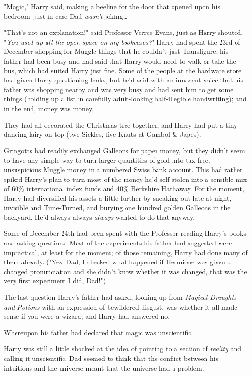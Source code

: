 "Magic," Harry said, making a beeline for the door that opened upon his 
bedroom, just in case Dad \emph{wasn't} joking{\ldots}

"That's not an explanation!" said Professor Verres-Evans, just as Harry 
shouted, "\emph{You used up all the open space on my bookcases?}"
\sbreak
Harry had spent the 23rd of December shopping for Muggle things that he 
couldn't just Transfigure; his father had been busy and had said that Harry 
would need to walk or take the bus, which had suited Harry just fine. Some of 
the people at the hardware store had given Harry questioning looks, but he'd 
said with an innocent voice that his father was shopping nearby and was very 
busy and had sent him to get some things (holding up a list in carefully 
adult-looking half-illegible handwriting); and in the end, money was money.

They had all decorated the Christmas tree together, and Harry had put a tiny 
dancing fairy on top (two Sickles, five Knuts at Gambol \& Japes).

Gringotts had readily exchanged Galleons for paper money, but they didn't seem 
to have any simple way to turn larger quantities of gold into tax-free, 
unsuspicious Muggle money in a numbered Swiss bank account. This had rather 
spiked Harry's plan to turn most of the money he'd self-stolen into a sensible 
mix of 60\% international index funds and 40\% Berkshire Hathaway. For the 
moment, Harry had diversified his assets a little further by sneaking out late 
at night, invisible and Time-Turned, and burying one hundred golden Galleons in 
the backyard. He'd always always \emph{always} wanted to do that anyway.

Some of December 24th had been spent with the Professor reading Harry's books 
and asking questions. Most of the experiments his father had suggested were 
impractical, at least for the moment; of those remaining, Harry had done many 
of them already. ("Yes, Dad, I checked what happened if Hermione was given a 
changed pronunciation and she didn't know whether it was changed, that was the 
very first experiment I did, Dad!")

The last question Harry's father had asked, looking up from \emph{Magical 
Draughts and Potions} with an expression of bewildered disgust, was whether it 
all made sense if you were a wizard; and Harry had answered no.

Whereupon his father had declared that magic was unscientific.

Harry was still a little shocked at the idea of pointing to a section of 
\emph{reality} and calling it unscientific. Dad seemed to think that the 
conflict between his intuitions and the universe meant that the universe had a 
problem.

